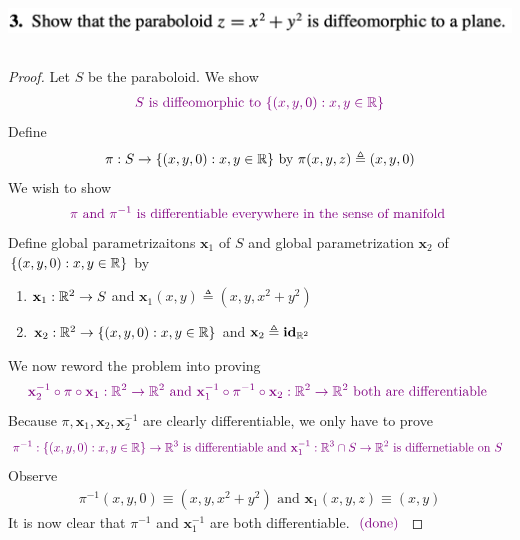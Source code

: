 \documentclass{report}
\begin{document}
\begin{question}{}{}
\includegraphics[height=1.5cm,width=18cm]{HW3a5}
\end{question}
\begin{proof}
Let $S$ be the paraboloid. We show 
\begin{align*}
\textcolor{violet}{S\text{ is diffeomorphic to }\{ (x,y,0):x,y\in\mathbb{R} \}}
\end{align*}
Define 
\begin{align*}
\pi:S\rightarrow \{ (x,y,0):x,y\in\mathbb{R} \}\text{ by }\pi(x,y,z)\triangleq (x,y,0)
\end{align*}
We wish to show 
\begin{align*}
\textcolor{violet}{\pi\text{ and }\pi^{-1}\text{ is differentiable everywhere in the sense of manifold }}
\end{align*}
Define global parametrizaitons $\textbf{x}_1$ of $S$ and global parametrization  $\textbf{x}_2$ of $\{ (x,y,0):x,y\in\mathbb{R} \}$ by
\begin{enumerate}[label=(\alph*)]
  \item $\textbf{x}_1:\mathbb{R}^2 \rightarrow S$ and $\textbf{x}_1(x,y)\triangleq (x,y,x^2+y^2)$ 
  \item $\textbf{x}_2:\mathbb{R}^2 \rightarrow \{ (x,y,0):x,y \in\mathbb{R} \}$ and $\textbf{x}_2\triangleq \textbf{id}_{\mathbb{R}^2}$
\end{enumerate}
We now reword the problem into proving 
\begin{align*}
  \textcolor{violet}{\textbf{x}_2^{-1}\circ \pi \circ \textbf{x}_1:\mathbb{R}^2 \rightarrow \mathbb{R}^2\text{ and }\textbf{x}_1^{-1}\circ \pi^{-1}\circ \textbf{x}_2:\mathbb{R}^2 \rightarrow \mathbb{R}^2\text{ both are differentiable }}
\end{align*}
Because $\pi,\textbf{x}_1,\textbf{x}_2,\textbf{x}_2^{-1}$ are clearly differentiable, we only have to prove 
\begin{align*}
  \textcolor{violet}{\pi^{-1}: \{ (x,y,0):x,y\in\mathbb{R} \}\rightarrow \mathbb{R}^3\text{ is differentiable and }\textbf{x}_1^{-1}:\mathbb{R}^3\cap S\rightarrow \mathbb{R}^2 \text{ is differnetiable on $S$ }}
\end{align*}
Observe 
\begin{align*}
\pi^{-1}(x,y,0)\equiv(x,y,x^2+y^2)\text{ and }\textbf{x}_1(x,y,z)\equiv(x,y)
\end{align*}
It is now clear that $\pi^{-1}$ and $\textbf{x}_1^{-1}$ are both differentiable. $\textcolor{violet}{\text{ (done) }}$
\end{proof}
\end{document}
